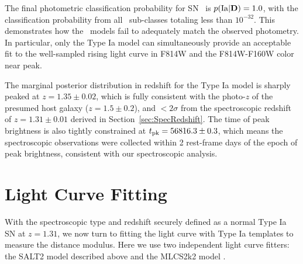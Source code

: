 The final photometric classification probability for SN \tomas\ is
$p({\rm Ia}|{\rm {\bf D}})=1.0$, with the classification probability
from all \CCSN\ sub-classes totaling less than
$10^{-32}$.   This demonstrates how the \CCSN\ models fail to
adequately match the observed photometry. In particular, only the Type
Ia model can simultaneously provide an acceptable fit to the
well-sampled rising light curve in F814W and the F814W-F160W color
near peak.

The marginal posterior distribution in redshift for the Type Ia model
is sharply peaked at $z=1.35\pm0.02$, which is fully consistent with
the photo-$z$ of the presumed host galaxy ($z=1.5\pm0.2$), and
$<2\sigma$ from the spectroscopic redshift of $z=1.31\pm0.01$ derived
in Section~\ref{sec:SpecRedshift}.  The time of peak brightness is
also tightly constrained at $t_{\rm pk}=56816.3\pm0.3$, which means
the spectroscopic observations were collected within 2 rest-frame days
of the epoch of peak brightness, consistent with our spectroscopic
analysis.


\section{Light Curve Fitting}
\label{sec:LightCurveFitting}

With the spectroscopic type and redshift securely defined as a normal
Type Ia SN at $z=1.31$, we now turn to fitting the light curve with
Type Ia templates to measure the distance modulus.  Here we use two
independent light curve fitters: the SALT2 model described
above and the MLCS2k2 model \citep{Jha:2007}.   


